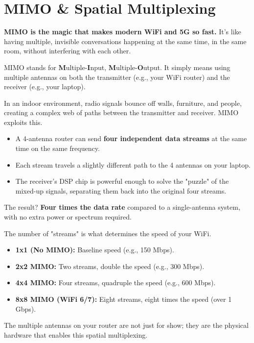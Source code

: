 
\chapter{MIMO \& Spatial Multiplexing}
\label{ch:mimo}

\begin{nontechnical}
    \textbf{MIMO is the magic that makes modern WiFi and 5G so fast.} It's like having multiple, invisible conversations happening at the same time, in the same room, without interfering with each other.

    MIMO stands for \textbf{M}ultiple-\textbf{I}nput, \textbf{M}ultiple-\textbf{O}utput. It simply means using multiple antennas on both the transmitter (e.g., your WiFi router) and the receiver (e.g., your laptop).

    In an indoor environment, radio signals bounce off walls, furniture, and people, creating a complex web of paths between the transmitter and receiver. MIMO exploits this.
    \begin{itemize}
        \item A 4-antenna router can send \textbf{four independent data streams} at the same time on the same frequency.
        \item Each stream travels a slightly different path to the 4 antennas on your laptop.
        \item The receiver's DSP chip is powerful enough to solve the "puzzle" of the mixed-up signals, separating them back into the original four streams.
    \end{itemize}
    The result? \textbf{Four times the data rate} compared to a single-antenna system, with no extra power or spectrum required.

    The number of "streams" is what determines the speed of your WiFi.
    \begin{itemize}
        \item \textbf{1x1 (No MIMO):} Baseline speed (e.g., 150 Mbps).
        \item \textbf{2x2 MIMO:} Two streams, double the speed (e.g., 300 Mbps).
        \item \textbf{4x4 MIMO:} Four streams, quadruple the speed (e.g., 600 Mbps).
        \item \textbf{8x8 MIMO (WiFi 6/7):} Eight streams, eight times the speed (over 1 Gbps).
    \end{itemize}
    The multiple antennas on your router are not just for show; they are the physical hardware that enables this spatial multiplexing.
\end{nontechnical}


